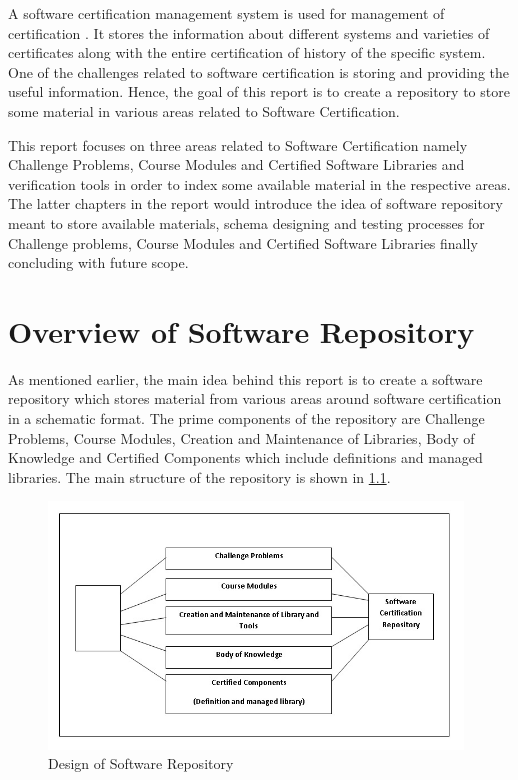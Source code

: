 \documentclass[11pt,letterpaper]{report}
\begin{document}
A software certification management system is used for management of certification \cite{SCMS}. It stores the information about different systems and varieties of certificates along with the entire certification of history of the specific system. One of the challenges related to software certification is storing and providing the useful information. Hence, the goal of this report is to create a repository to store some material in various areas related to Software Certification.  

This report focuses on three areas related to Software Certification namely Challenge Problems, Course Modules and Certified Software Libraries and verification tools in order to index some available material in the respective areas. The latter chapters in the report would introduce the idea of software repository meant to store available materials, schema designing and testing processes for Challenge problems, Course Modules and Certified Software Libraries finally concluding with future scope.  

\chapter{Overview of Software Repository}
As mentioned earlier, the main idea behind this report is to create a software repository which stores material from various areas around software certification in a schematic format. The prime components of the repository are Challenge Problems, Course Modules, Creation and Maintenance of Libraries, Body of Knowledge and Certified Components which include definitions and managed libraries. The main structure of the repository is shown in \ref{Fig:1}.
\begin{figure}[ht]
\centering
\includegraphics[width=110mm]{Images/Overview_SW_Repo.jpg}
\caption{Design of Software Repository}
\label{Fig:1}
\end{figure}
\end{document}
